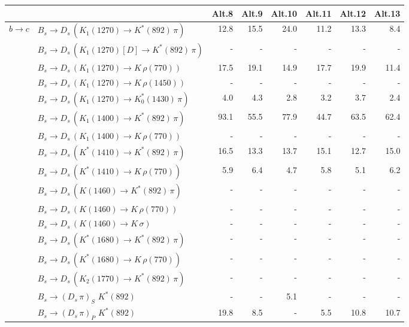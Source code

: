 \begin{tabular}{l l  r  r  r  r  r  r  } 
\hline
\hline
&  & \multicolumn{1}{c}{Alt.8}  & \multicolumn{1}{c}{Alt.9}  & \multicolumn{1}{c}{Alt.10}  & \multicolumn{1}{c}{Alt.11}  & \multicolumn{1}{c}{Alt.12}  & \multicolumn{1}{c}{Alt.13}  \\ 
\hline
\multirow{28}{*}{$b \to c$}  & $B_s \to D_s \, ( K_1(1270) \to K^{*}(892) \, \pi )$ & 12.8 & 15.5 & 24.0 & 11.2 & 13.3 & 8.4 \\ 
 & $B_s \to D_s \, ( K_1(1270)[D] \to K^{*}(892) \, \pi )$ & -  & -  & -  & -  & -  & -  \\ 
 & $B_s \to D_s \, ( K_1(1270) \to K \, \rho(770) )$ & 17.5 & 19.1 & 14.9 & 17.7 & 19.9 & 11.4 \\ 
 & $B_s \to D_s \, ( K_1(1270) \to K \, \rho(1450) )$ & -  & -  & -  & -  & -  & -  \\ 
 & $B_s \to D_s \, ( K_1(1270) \to K^{*}_{0}(1430) \, \pi )$ & 4.0 & 4.3 & 2.8 & 3.2 & 3.7 & 2.4 \\ 
 & $B_s \to D_s \, ( K_1(1400) \to K^{*}(892) \, \pi )$ & 93.1 & 55.5 & 77.9 & 44.7 & 63.5 & 62.4 \\ 
 & $B_s \to D_s \, ( K_1(1400) \to K \, \rho(770) )$ & -  & -  & -  & -  & -  & -  \\ 
 & $B_s \to D_s \, ( K^{*}(1410) \to K^{*}(892) \, \pi )$ & 16.5 & 13.3 & 13.7 & 15.1 & 12.7 & 15.0 \\ 
 & $B_s \to D_s \, ( K^{*}(1410) \to K \, \rho(770) )$ & 5.9 & 6.4 & 4.7 & 5.8 & 5.1 & 6.2 \\ 
 & $B_s \to D_s \, ( K(1460) \to K^{*}(892) \, \pi )$ & -  & -  & -  & -  & -  & -  \\ 
 & $B_s \to D_s \, ( K(1460) \to K \, \rho(770) )$ & -  & -  & -  & -  & -  & -  \\ 
 & $B_s \to D_s \, ( K(1460) \to K \, \sigma )$ & -  & -  & -  & -  & -  & -  \\ 
 & $B_s \to D_s \, ( K^{*}(1680) \to K^{*}(892) \, \pi )$ & -  & -  & -  & -  & -  & -  \\ 
 & $B_s \to D_s \, ( K^{*}(1680) \to K \, \rho(770) )$ & -  & -  & -  & -  & -  & -  \\ 
 & $B_s \to D_s \, ( K_2(1770) \to K^{*}(892) \, \pi )$ & -  & -  & -  & -  & -  & -  \\ 
 & $B_s \to ( D_s \, \pi)_{S} \, \, K^{*}(892)$ & -  & -  & 5.1 & -  & -  & -  \\ 
 & $B_s \to ( D_s \, \pi)_{P} \, \, K^{*}(892)$ & 19.8 & 8.5 & -  & 5.5 & 10.8 & 10.7 \\ 

\end{tabular}
